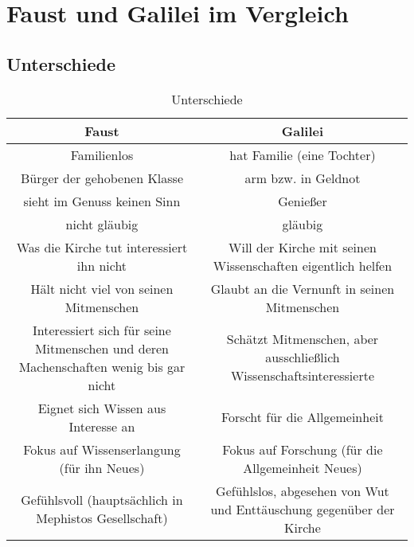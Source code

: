 \documentclass[12pt]{scrreprt}
\begin{document}
\chapter{Faust und Galilei im Vergleich}
	\label{chap:faust galilei vergleich}
\section{Unterschiede}
	\label{sec:unterschiede}
	\begin{table}[!htb]
		\centering
		\caption[Unterschiede]{Unterschiede\footnotemark}
		\begin{tabulary}{\textwidth}{|C|C|}
			\hline
			\textbf{Faust} & \textbf{Galilei} \\
			\hline
			Familienlos & hat Familie (eine Tochter) \\
			\hline
			Bürger der gehobenen Klasse & arm bzw. in Geldnot \\
			\hline
			sieht im Genuss keinen Sinn & Genießer \\
			\hline
			nicht gläubig & gläubig \\
			\hline
			Was die Kirche tut interessiert ihn nicht & Will der Kirche mit seinen Wissenschaften eigentlich helfen \\
			\hline
			Hält nicht viel von seinen Mitmenschen & Glaubt an die Vernunft in seinen Mitmenschen \\
			\hline
			Interessiert sich für seine Mitmenschen und deren Machenschaften wenig bis gar nicht & Schätzt Mitmenschen, aber ausschließlich Wissenschaftsinteressierte \\
			\hline
			Eignet sich Wissen aus Interesse an & Forscht für die Allgemeinheit \\
			\hline
			Fokus auf Wissenserlangung (für ihn Neues) & Fokus auf Forschung (für die Allgemeinheit Neues) \\
			\hline
			Gefühlsvoll (hauptsächlich in Mephistos Gesellschaft) & Gefühlslos, abgesehen von Wut und Enttäuschung gegenüber der Kirche \\
			\hline
		\end{tabulary}
		\label{tab:unterschiede}
	\end{table}
\newpage
\end{document}
